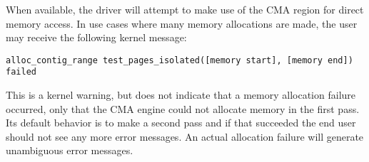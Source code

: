 \iffalse
This file is protected by Copyright. Please refer to the COPYRIGHT file
distributed with this source distribution.

This file is part of OpenCPI <http://www.opencpi.org>

OpenCPI is free software: you can redistribute it and/or modify it under the
terms of the GNU Lesser General Public License as published by the Free Software
Foundation, either version 3 of the License, or (at your option) any later
version.

OpenCPI is distributed in the hope that it will be useful, but WITHOUT ANY
WARRANTY; without even the implied warranty of MERCHANTABILITY or FITNESS FOR A
PARTICULAR PURPOSE. See the GNU Lesser General Public License for more details.

You should have received a copy of the GNU Lesser General Public License along
with this program. If not, see <http://www.gnu.org/licenses/>.
\fi

\newlength{\savedparindentdrvr}%
\setlength{\savedparindentdrvr}{\parindent}%
\setlength{\parindent}{0pt} %
\providecommand{\forceindent}{\leavevmode{\parindent=1em\indent}}%

When available, the driver will attempt to make use of the CMA region for direct memory access. In use cases where many memory allocations are made, the user may receive the following kernel message:

\begin{verbatim}
alloc_contig_range test_pages_isolated([memory start], [memory end]) failed
\end{verbatim}

This is a kernel warning, but does not indicate that a memory allocation failure occurred, only that the CMA engine could not allocate memory in the first pass. Its default behavior is to make a second pass and if that succeeded the end user should not see any more error messages. An actual allocation failure will generate unambiguous error messages.

\setlength{\parindent}{\savedparindentdrvr}%
